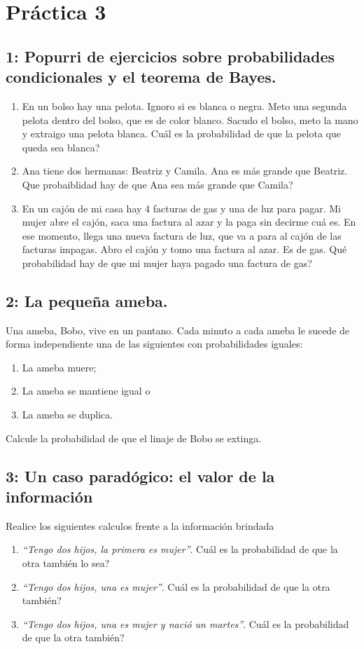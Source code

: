 \newpage
\section*{Pr\'actica 3}
\subsection*{1: Popurri de ejercicios sobre probabilidades condicionales y el teorema de Bayes.}
\begin{enumerate}
    \item En un bolso hay una pelota. Ignoro si es blanca o negra. Meto una segunda pelota dentro del bolso, que es de color blanco. Sacudo el bolso, meto la mano y extraigo una pelota blanca. Cu\'al es la probabilidad de que la pelota que queda sea blanca?
    \item Ana tiene dos hermanas: Beatriz y Camila. Ana es m\'as grande que Beatriz. Que probaiblidad hay de que Ana sea m\'as grande que Camila?
    \item En un caj\'on de mi casa hay 4 facturas de gas y una de luz para pagar. Mi mujer abre el caj\'on, saca una factura al azar y la paga sin decirme cu\'a es. En ese momento, llega una nueva factura de luz, que va a para al caj\'on de las facturas impagas. Abro el caj\'on y tomo una factura al azar. Es de gas. Qu\'e probabilidad hay de que mi mujer haya pagado una factura de gas?
\end{enumerate}

\subsection*{2: La pequeña ameba.}
Una ameba, Bobo, vive en un pantano. Cada minuto a cada ameba le sucede de forma independiente una de las siguientes con probabilidades iguales:
\begin{enumerate}
    \item La ameba muere;
    \item La ameba se mantiene igual o
    \item La ameba se duplica.
\end{enumerate}
Calcule la probabilidad de que el linaje de Bobo se extinga.
\subsection*{3: Un caso parad\'ogico: el valor de la informaci\'on}
Realice los siguientes calculos frente a la informaci\'on brindada
\begin{enumerate}
    \item {\it ``Tengo dos hijos, la primera es mujer''}. Cu\'al es la probabilidad de que la otra tambi\'en lo sea?
    \item {\it ``Tengo dos hijos, una es mujer''}. Cu\'al es la probabilidad de que la otra tambi\'en?
    \item {\it ``Tengo dos hijos, una es mujer y naci\'o un martes''}.  Cu\'al es la probabilidad de que la otra tambi\'en?
\end{enumerate}
